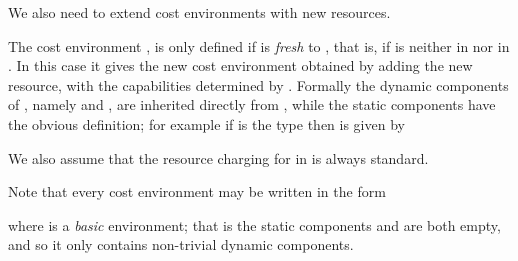 \documentclass{LMCS}
\newcommand{\leaveout}[1]{ }
\newcommand{\EndDefBox}{\null\hfill}
\newcommand{\boxHere}{\global\let\EndProof\empty\EndDefBox}
\begin{document}
\leaveout{
The restriction in (i) that the owners   and  be 
different is slightly inconvenient, but as we will see it simplifies the
development of the theory somewhat. This simplification will be a consequence
of  the following result:
\begin{lem}\label{lem:1}
  Suppose  and 
. Then 
. 
\end{lem}
\proof
Ah 
\qed
It is worth pointing out that this result is no longer true if condition
(i) is omitted from Definition~\ref{def:costenv}.
\begin{exa}\label{ex:1}
 A natural definition of  would be to allow
 whenever  is determined
by

with the other components of  being determined 
as in Definition~\ref{def:costenv}.

With this definition Lemma~\ref{lem:1} is no longer true. Let 
be a cost environment with resource  with associated costings 
and , and suppose there are two owners, with funds given by
.  Then there is a cost
environment  such that
\begin{enumerate}[]
\item 

\item 

\item but \textbf{not} .
\end{enumerate}
 is determined by the fact that  and 
.  It follows that 
can not be true as it requires  to be 
, namely . \qed
\end{exa}

}
\noindent
We also need to extend cost environments with new resources.
\begin{defi}\label{def:resourcereg}
  The cost environment , is only defined if
   is \emph{fresh} to , that is, if  is neither in
   nor in . In this case it gives the new
  cost environment  obtained by adding the new resource, with
  the capabilities determined by .  Formally the dynamic components
of , namely  and , are inherited directly
from , while the static components have the obvious definition; for 
example if  is the type  then  is given by

We also assume that the  resource charging for 
  in  is always standard. \boxHere
\end{defi}

\noindent
Note that every cost environment may be written in the form

where   is a \emph{basic} environment;
that is the static components  and 
are both empty, and so it 
only contains  non-trivial dynamic components. 
\end{document}
